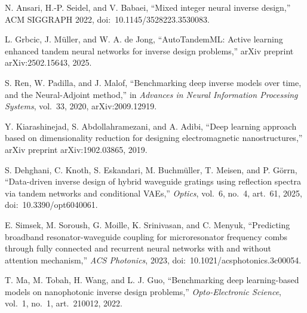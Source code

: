 \documentclass[11pt]{article}
\begin{document}
\begin{enumerate}[label={[\arabic*]},leftmargin=2.2em,itemsep=3pt]
\item N. Ansari, H.-P. Seidel, and V. Babaei, ``Mixed integer neural inverse design,'' ACM SIGGRAPH 2022, doi:~10.1145/3528223.3530083.
\item L. Grbcic, J. M\"uller, and W. A. de Jong, ``AutoTandemML: Active learning enhanced tandem neural networks for inverse design problems,'' arXiv preprint arXiv:2502.15643, 2025.
\item S. Ren, W. Padilla, and J. Malof, ``Benchmarking deep inverse models over time, and the Neural-Adjoint method,'' in \emph{Advances in Neural Information Processing Systems}, vol.~33, 2020, arXiv:2009.12919.
\item Y. Kiarashinejad, S. Abdollahramezani, and A. Adibi, ``Deep learning approach based on dimensionality reduction for designing electromagnetic nanostructures,'' arXiv preprint arXiv:1902.03865, 2019.
\item S. Dehghani, C. Knoth, S. Eskandari, M. Buchm\"uller, T. Meisen, and P. G\"orrn, ``Data-driven inverse design of hybrid waveguide gratings using reflection spectra via tandem networks and conditional VAEs,'' \emph{Optics}, vol.~6, no.~4, art.~61, 2025, doi:~10.3390/opt6040061.
\item E. Simsek, M. Soroush, G. Moille, K. Srinivasan, and C. Menyuk, ``Predicting broadband resonator-waveguide coupling for microresonator frequency combs through fully connected and recurrent neural networks with and without attention mechanism,'' \emph{ACS Photonics}, 2023, doi:~10.1021/acsphotonics.3c00054.
\item T. Ma, M. Tobah, H. Wang, and L. J. Guo, ``Benchmarking deep learning-based models on nanophotonic inverse design problems,'' \emph{Opto-Electronic Science}, vol.~1, no.~1, art.~210012, 2022.
\end{enumerate}
\endgroup
\end{document}
